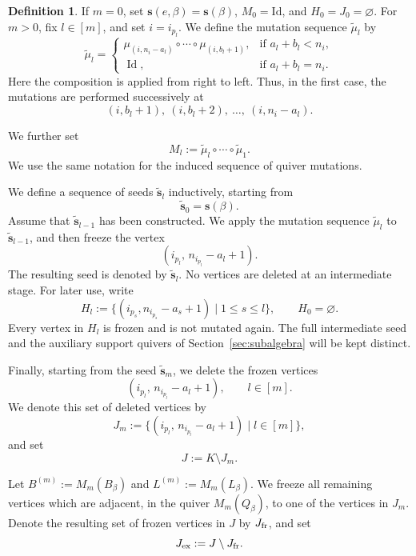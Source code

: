 \documentclass[12pt, reqno]{amsart}
\theoremstyle{plain}
\theoremstyle{definition}
\newtheorem{definition}[theorem]{Definition}
\numberwithin{equation}{section}
\newcommand{\Id}{\operatorname{Id}}
\begin{document}
\begin{definition}\label{def:svbeta}
If \(m=0\), set \(\mathbf s(e,\beta)=\mathbf s(\beta)\),
\(M_0=\mathrm{Id}\), and \(H_0=J_0=\varnothing\).
For \(m>0\), fix \(l\in[m]\), and set \(i=i_{p_l}\). We define the mutation sequence
\(\widetilde{\mu}_l\) by
\begin{equation}
\widetilde{\mu}_l=
\begin{cases}
\mu_{(i,n_i-a_l)}\circ \cdots \circ \mu_{(i,b_l+1)},
& \text{if } a_l+b_l<n_i,\\[4pt]
\Id,
& \text{if } a_l+b_l=n_i.
\end{cases}
\end{equation}
Here the composition is applied from right to left. Thus, in the first case,
the mutations are performed successively at
\[
(i,b_l+1),\ (i,b_l+2),\ \dots,\ (i,n_i-a_l).
\]

We further set
\begin{equation}
M_l:=\widetilde{\mu}_l\circ \cdots \circ \widetilde{\mu}_1 .
\end{equation}
We use the same notation for the induced sequence of quiver mutations.

We define a sequence of seeds \(\widetilde{\mathbf{s}}_l\) inductively, starting
from
\[
\widetilde{\mathbf{s}}_0=\mathbf{s}(\beta).
\]
Assume that \(\widetilde{\mathbf{s}}_{l-1}\) has been constructed. We apply the
mutation sequence \(\widetilde{\mu}_l\) to \(\widetilde{\mathbf{s}}_{l-1}\), and
then freeze the vertex
\[
(i_{p_l},\, n_{i_{p_l}}-a_l+1).
\]
The resulting seed is denoted by \(\widetilde{\mathbf{s}}_l\).
No vertices are deleted at an intermediate stage. For later use, write
\[
H_l:=\{(i_{p_s},n_{i_{p_s}}-a_s+1)\mid 1\le s\le l\},
\qquad H_0=\varnothing.
\]
Every vertex in \(H_l\) is frozen and is not mutated again. The full
intermediate seed and the auxiliary support quivers of
Section~\ref{sec:subalgebra} will be kept distinct.

Finally, starting from the seed \(\widetilde{\mathbf{s}}_m\), we delete the
frozen vertices
\[
(i_{p_l},\, n_{i_{p_l}}-a_l+1),
\qquad l\in[m].
\]
We denote this set of deleted vertices by
\[
J_m:=\{(i_{p_l},\, n_{i_{p_l}}-a_l+1)\mid l\in[m]\},
\]
and set
\[
J:=K\setminus J_m.
\]

Let \(B^{(m)}:=M_m(B_\beta)\) and \(L^{(m)}:=M_m(L_\beta)\). We freeze all
remaining vertices which are adjacent, in the quiver \(M_m(Q_\beta)\), to one
of the vertices in \(J_m\). Denote the resulting set of frozen vertices in
\(J\) by \(J_{\rm fr}\), and set
\[
J_{\rm ex}:=J\setminus J_{\rm fr}.
\]


\end{definition}
\end{document}
